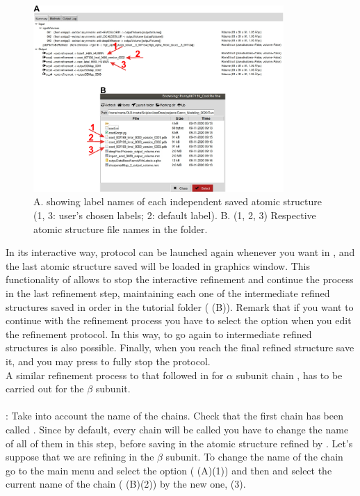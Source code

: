  \begin{figure}[H]
  \centering 
  \captionsetup{width=.9\linewidth} 
  \includegraphics[width=0.85\textwidth]{Images/Fig26}
  \caption{A. \coot {} showing label names of each independent saved atomic structure (1, 3: user's chosen labels; 2: default label). B. (1, 2, 3) Respective atomic structure file names in the  folder.}
  \label{fig:coot_summary}
  \end{figure}
 
 In its interactive way,  protocol can be launched again whenever you want in \scipion, and the last atomic structure saved will be loaded in \coot graphics window. This functionality of \scipion allows to stop the interactive refinement and continue the process in the last refinement step, maintaining each one of the intermediate refined structures saved in order in the \scipion tutorial folder  ( (B)). Remark that if you want to continue with the refinement process you have to select the  option  when you edit the \coot refinement protocol. In this way, to go again to intermediate refined structures is also possible. Finally, when you reach the final refined structure save it, and you may press  to fully stop the \coot protocol.\\
 
 A similar refinement process to that followed in \coot for  $\alpha$ subunit chain , has to be carried out for the  $\beta$ subunit.\\
 \\
 : Take into account the name of the chains. Check that the first chain has been called . Since by default, every chain will be called  you have to change the name of all of them in this step, before saving in \scipion the atomic structure refined by \coot. Let's suppose that we are refining in \coot the  $\beta$ subunit. To change the name of the chain go to the \coot main menu and select the option  ( (A)(1)) and then  and select the current name of the chain  ( (B)(2)) by the new one,  (3).
 
